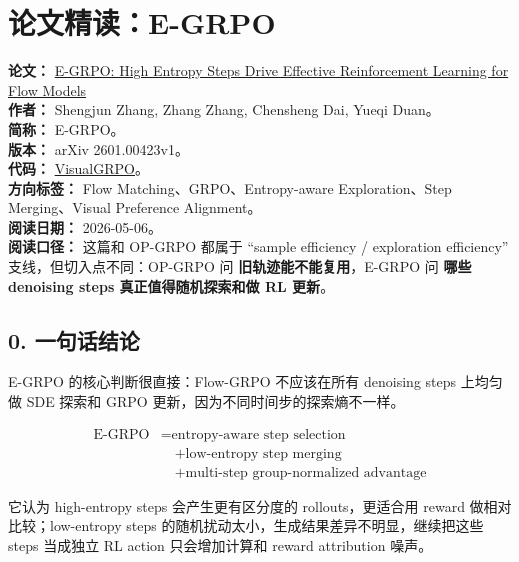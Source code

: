 
\section{论文精读：E-GRPO}

\begin{conceptbox}
\textbf{论文：} \href{https://arxiv.org/abs/2601.00423}{E-GRPO: High Entropy Steps Drive Effective Reinforcement Learning for Flow Models}\\
\textbf{作者：} Shengjun Zhang, Zhang Zhang, Chensheng Dai, Yueqi Duan。\\
\textbf{简称：} E-GRPO。\\
\textbf{版本：} arXiv 2601.00423v1。\\
\textbf{代码：} \href{https://github.com/shengjun-zhang/VisualGRPO}{VisualGRPO}。\\
\textbf{方向标签：} Flow Matching、GRPO、Entropy-aware Exploration、Step Merging、Visual Preference Alignment。\\
\textbf{阅读日期：} 2026-05-06。\\
\textbf{阅读口径：} 这篇和 OP-GRPO 都属于 ``sample efficiency / exploration efficiency'' 支线，但切入点不同：OP-GRPO 问 \textbf{旧轨迹能不能复用}，E-GRPO 问 \textbf{哪些 denoising steps 真正值得随机探索和做 RL 更新}。
\end{conceptbox}

\subsection{0. 一句话结论}

E-GRPO 的核心判断很直接：Flow-GRPO 不应该在所有 denoising steps 上均匀做 SDE 探索和 GRPO 更新，因为不同时间步的探索熵不一样。

\[
\begin{aligned}
\text{E-GRPO}
&= \text{entropy-aware step selection}\\
&\quad + \text{low-entropy step merging}\\
&\quad + \text{multi-step group-normalized advantage}
\end{aligned}
\]

它认为 high-entropy steps 会产生更有区分度的 rollouts，更适合用 reward 做相对比较；low-entropy steps 的随机扰动太小，生成结果差异不明显，继续把这些 steps 当成独立 RL action 只会增加计算和 reward attribution 噪声。

